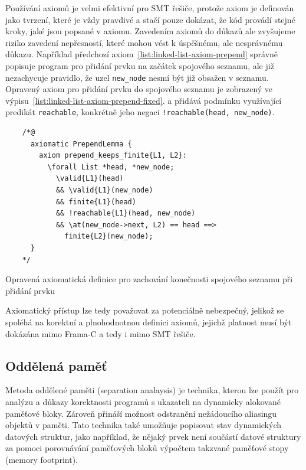 Používání axiomů je velmi efektivní pro SMT řešiče,
protože axiom je definován jako tvrzení, které je vždy pravdivé a stačí pouze dokázat,
že kód provádí stejné kroky, jaké jsou popsané v axiomu.
Zavedením axiomů do důkazů ale zvyšujeme riziko zavedení nepřesností,
které mohou vést k úspěšnému, ale nesprávnému důkazu.
Například předchozí axiom~\ref{list:linked-list-axiom-prepend} správně popisuje
program pro přidání prvku na začátek spojového seznamu,
ale již nezachycuje pravidlo, že uzel \texttt{new\_node} nesmí být již obsažen v seznamu.
Opravený axiom pro přidání prvku do spojového seznamu
je zobrazený ve výpisu~\ref{list:linked-list-axiom-prepend-fixed}.
a přidává podmínku využívající predikát \texttt{reachable},
konkrétně jeho negaci \texttt{!reachable(head, new\_node)}.

\begin{listing}[H]
    \begin{verbatim}
    /*@
      axiomatic PrependLemma {
        axiom prepend_keeps_finite{L1, L2}:
          \forall List *head, *new_node;
            \valid{L1}(head)
            && \valid{L1}(new_node)
            && finite{L1}(head)
            && !reachable{L1}(head, new_node)
            && \at(new_node->next, L2) == head ==>
              finite{L2}(new_node);
      }
    */
    \end{verbatim}
    \caption{Opravená axiomatická definice pro zachování konečnosti spojového seznamu při přidání prvku}
    \label{list:linked-list-axiom-prepend-fixed}
\end{listing}

Axiomatický přístup lze tedy považovat za potenciálně nebezpečný,
jelikož se spoléhá na korektní a plnohodnotnou definici axiomů,
jejichž platnost musí být dokázána mimo Frama\mbox{-}C a tedy i mimo SMT řešiče.

\subsection{Oddělená paměť}
\label{subsec:oddelena-pamet}

Metoda oddělené paměti (separation analaysis) je technika,
kterou lze použít pro analýzu a důkazy korektnosti programů
s ukazateli na dynamicky alokované paměťové bloky.
Zároveň přináší možnost odstranění nežádoucího aliasingu
objektů v paměti.
Tato technika také umožňuje popisovat stav dynamických datových struktur,
jako například, že nějaký prvek není součástí datové struktury
za pomoci porovnávání paměťových bloků výpočtem takzvané paměťové stopy (memory footprint).

